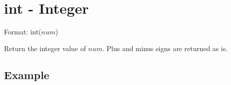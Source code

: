 
%

\section{int - Integer\label{sect:int}}

Format: int($num$)

Return the integer value of $num$. Plus and minus signs are returned as is.


\subsection*{Example}


%

